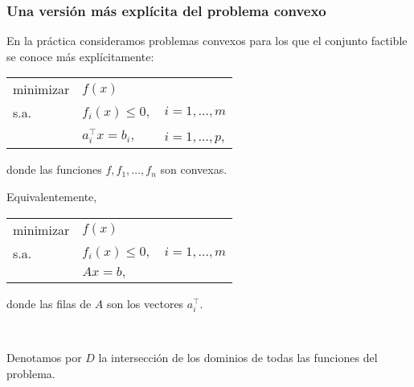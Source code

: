 \documentclass{beamer}
\begin{document}
\begin{frame}
\frametitle{Una versión más explícita del problema convexo}

En la práctica consideramos problemas convexos para los que el conjunto factible se conoce más explícitamente:

\begin{center}
\begin{tabular}{lll}
minimizar & $f(x)$ & \\
s.a. & $f_i(x)\leq 0,$  &  $i=1,\ldots,m$ \\
	 & $a^\top_i x = b_i,$  &  $i=1,\ldots,p$,
\end{tabular}
\end{center}
donde las funciones $f,f_1,\ldots, f_n$ son convexas. 



Equivalentemente,
\begin{center}
\begin{tabular}{lll}
minimizar & $f(x)$ & \\
s.a. & $f_i(x)\leq 0,$  &  $i=1,\ldots,m$ \\
	 & $Ax=b,$  &  
\end{tabular}
\end{center}
donde las filas de $A$ son los vectores $a_i^\top$.

\

Denotamos por $D$ la intersección de los dominios de todas las funciones del problema.

\end{frame}

\end{document}
